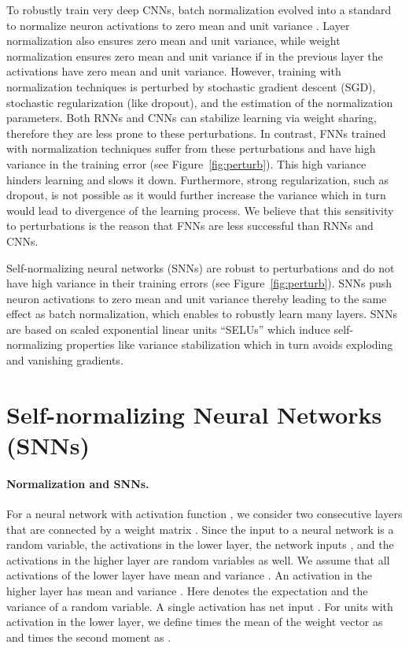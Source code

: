 \documentclass{article}
\begin{document}
To robustly train very deep CNNs, batch normalization evolved into a standard to normalize
neuron activations to zero mean and unit variance \citep{bib:Ioffe2015}. 
Layer normalization \citep{bib:Ba2016} also ensures zero mean and unit
variance, while weight normalization \citep{bib:Salimans2016} ensures
zero mean and unit variance if in the previous layer the activations have
zero mean and unit variance.
However, training with normalization techniques is perturbed by
stochastic gradient descent (SGD), stochastic
regularization (like dropout), 
and the estimation of the normalization parameters.
Both RNNs and CNNs can stabilize learning via weight sharing, 
therefore they are less prone to these perturbations. 
In contrast, FNNs trained with normalization techniques suffer from
these perturbations and have high variance 
in the training error (see Figure~\ref{fig:perturb}). 
This high variance hinders learning and slows it down. 
Furthermore, strong regularization, such as dropout, 
is not possible as it would further 
increase the variance which in turn would lead to divergence of  the
learning process.
We believe that this sensitivity to perturbations 
is the reason that FNNs are less
successful than RNNs and CNNs.

Self-normalizing neural networks (SNNs) are robust to perturbations
and do not have high variance in their training errors (see Figure~\ref{fig:perturb}).
SNNs push neuron activations to zero mean and unit variance 
thereby leading to the same effect as batch normalization,
which enables to robustly learn many layers. 
SNNs are based on scaled exponential linear units ``SELUs''
which induce self-normalizing properties like variance stabilization
which in turn avoids exploding and vanishing gradients.


\section*{Self-normalizing Neural Networks (SNNs)}
\paragraph{Normalization and SNNs.}
For a neural network with activation function , 
we consider two consecutive layers 
that are connected by a weight matrix .
Since the input to a neural
network is a random variable, 
the activations  in the lower
layer, the network inputs , and the 
activations  in the higher layer are
random variables as well. 
We assume that all activations  of the lower layer
have mean 
 and variance . 
An activation  in the
higher layer has mean
 and variance
. 
Here  denotes the expectation and
 the variance of a random variable.
A single activation  has net input 
. 
For  units with activation 
 in the lower layer, we define   
times the mean of the 
weight vector  as  and 
times the second moment as .
\end{document}
